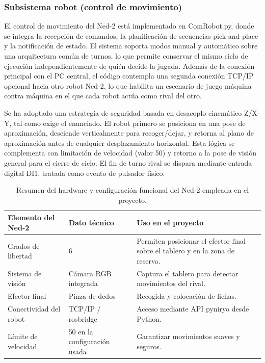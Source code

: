 \documentclass[12pt,a4paper]{article}
\begin{document}
\subsubsection{Subsistema robot (control de movimiento)}
El control de movimiento del Ned-2 est\'a implementado en ComRobot.py, donde se integra la recepci\'on de comandos, la planificaci\'on de secuencias pick-and-place y la notificaci\'on de estado. El sistema soporta modos manual y autom\'atico sobre una arquitectura com\'un de turnos, lo que permite conservar el mismo ciclo de ejecuci\'on independientemente de qui\'en decide la jugada. Adem\'as de la conexi\'on principal con el PC central, el c\'odigo contempla una segunda conexi\'on TCP/IP opcional hacia otro robot Ned-2, lo que habilita un escenario de juego m\'aquina contra m\'aquina en el que cada robot act\'ua como rival del otro.
\par
Se ha adoptado una estrategia de seguridad basada en desacoplo cinem\'atico Z/X-Y, tal como exige el enunciado. El robot primero se posiciona en una pose de aproximaci\'on, desciende verticalmente para recoger/dejar, y retorna al plano de aproximaci\'on antes de cualquier desplazamiento horizontal. Esta l\'ogica se complementa con limitaci\'on de velocidad (valor 50) y retorno a la pose de visi\'on general para el cierre de ciclo. El fin de turno rival se dispara mediante entrada digital DI1, tratada como evento de pulsador f\'isico.

\begin{table}[H]
\centering
\footnotesize
\begin{tabular}{P{0.28\textwidth} P{0.18\textwidth} P{0.42\textwidth}}
\toprule
\textbf{Elemento del Ned-2} & \textbf{Dato t\'ecnico} & \textbf{Uso en el proyecto} \\
\midrule
Grados de libertad & 6 & Permiten posicionar el efector final sobre el tablero y en la zona de reserva. \\
Sistema de visi\'on & C\'amara RGB integrada & Captura el tablero para detectar movimientos del rival. \\
Efector final & Pinza de dedos & Recogida y colocaci\'on de fichas. \\
Conectividad del robot & TCP/IP / rosbridge & Acceso mediante API pyniryo desde Python. \\
L\'imite de velocidad & 50 en la configuraci\'on usada & Garantizar movimientos suaves y seguros. \\
\bottomrule
\end{tabular}
\caption{Resumen del hardware y configuraci\'on funcional del Ned-2 empleada en el proyecto.}
\end{table}
\end{document}

